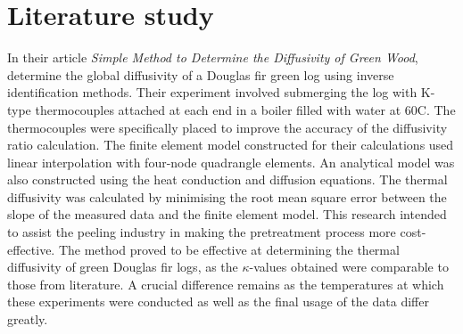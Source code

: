 \section{Literature study}\label{litstudy}

	
	In their article \textit{Simple Method to Determine the Diffusivity of Green Wood}, \citet{bioresource:2020}  determine the global diffusivity of a Douglas fir green log using inverse identification methods. 
	Their experiment involved submerging the log with K-type thermocouples attached at each end in a boiler filled with water at 60\textdegree C.
	The thermocouples were specifically placed to improve the accuracy of the diffusivity ratio calculation.
	The finite element model constructed for their calculations used linear interpolation with four-node quadrangle elements.
	An analytical model was also constructed using the heat conduction and diffusion equations.
	The thermal diffusivity was calculated by minimising the root mean square error between the slope of the measured data and the finite element model.
	This research intended to assist the peeling industry in making the pretreatment process more cost-effective.
	The method proved to be effective at determining the thermal diffusivity of green Douglas fir logs, as the $\kappa$-values obtained were comparable to those from literature.
	A crucial difference remains as the temperatures at which these experiments were conducted as well as the final usage of the data differ greatly.


